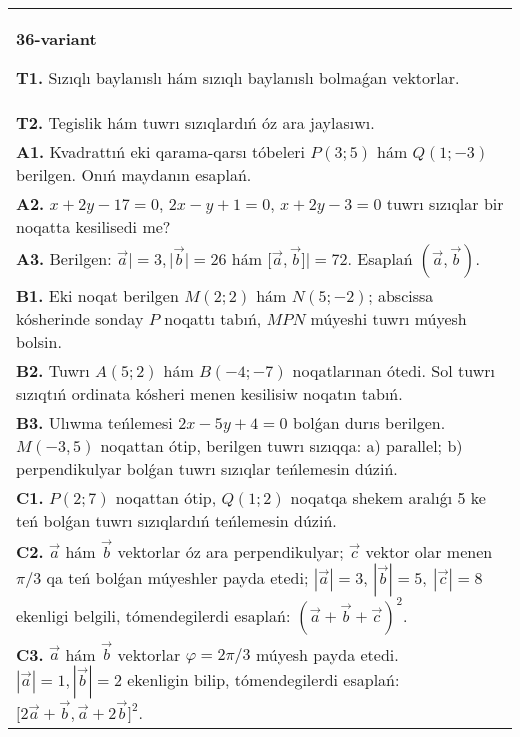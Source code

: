 \documentclass{article}
\begin{document}
\begin{tabular}{m{17cm}}
\textbf{36-variant}

\textbf{T1.} 
Sızıqlı baylanıslı hám sızıqlı baylanıslı bolmaǵan vektorlar.
 \\
\textbf{T2.} 
Tegislik hám tuwrı sızıqlardıń óz ara jaylasıwı.
 \\
\textbf{A1.} 
Kvadrattıń eki qarama-qarsı tóbeleri $P (3; 5) $ hám
$Q (1; -3) $ berilgen. Onıń maydanın esaplań.
 \\
\textbf{A2.} 
$x+2y-17=0$, $2x-y+1=0$, $x+2y-3=0$
tuwrı sızıqlar bir noqatta kesilisedi me?
 \\
\textbf{A3.} 
Berilgen: $\overrightarrow{a}| = 3,|\overrightarrow{b}| = 26$ hám
$\lbrack\overrightarrow{a},\overrightarrow{b}\rbrack| = 72$. Esaplań
$\left(\overrightarrow{a},\overrightarrow{b} \right) $.
 \\
\textbf{B1.} 
Eki noqat berilgen \(M (2;2) \) hám \(N (5;-2) \); abscissa kósherinde sonday $P$ noqattı tabıń, $MPN$ múyeshi tuwrı múyesh bolsin.
 \\
\textbf{B2.} 
Tuwrı \(A (5;2) \) hám \(B (-4; -7) \) noqatlarınan ótedi.
Sol tuwrı sızıqtıń ordinata kósheri menen kesilisiw noqatın tabıń.
 \\
\textbf{B3.} 
Ulıwma teńlemesi \(2x-5y+4=0\) bolǵan durıs
berilgen. \(M (-3,5) \) noqattan ótip, berilgen tuwrı sızıqqa: a) parallel;
b) perpendikulyar bolǵan tuwrı sızıqlar teńlemesin dúziń.
 \\
\textbf{C1.} 
\(P (2;7) \) noqattan ótip, \(Q (1;2) \) noqatqa shekem
aralıǵı 5 ke teń bolǵan tuwrı sızıqlardıń teńlemesin dúziń.
 \\
\textbf{C2.} 
$\vec{a}$ hám $\vec{b}$ vektorlar óz ara perpendikulyar; $\vec{c}$ vektor olar menen $\pi/3$ qa teń bolǵan múyeshler payda etedi; $|\vec{a}| = 3$, $|\vec{b}| = 5,\ |\vec{c}| = 8$ ekenligi belgili, tómendegilerdi esaplań:
$ (\vec{a} + \vec{b} + \vec{c}) ^{2}$.
 \\
\textbf{C3.} 
$\vec{a}$ hám $\vec{b}$ vektorlar $\varphi = 2\pi/3$ múyesh payda etedi. $|\vec{a}| = 1,|\vec{b}| = 2$ ekenligin bilip, tómendegilerdi esaplań:
$\lbrack 2\overrightarrow{a} + \overrightarrow{b},\overrightarrow{a} + 2\overrightarrow{b}\rbrack^{2}$.
 \\

\end{tabular}
\vspace{1cm}
\end{document}
